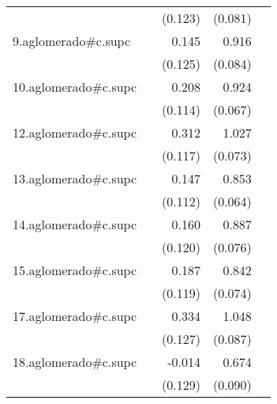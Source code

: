 {\begin{longtable}{l*{4}{D{.}{.}{-1}}}
            &                     &     (0.123)         &     (0.081)         &                     \\
\addlinespace
9.aglomerado#c.supc&                     &       0.145         &       0.916\sym{***}&                     \\
            &                     &     (0.125)         &     (0.084)         &                     \\
\addlinespace
10.aglomerado#c.supc&                     &       0.208         &       0.924\sym{***}&                     \\
            &                     &     (0.114)         &     (0.067)         &                     \\
\addlinespace
12.aglomerado#c.supc&                     &       0.312\sym{**} &       1.027\sym{***}&                     \\
            &                     &     (0.117)         &     (0.073)         &                     \\
\addlinespace
13.aglomerado#c.supc&                     &       0.147         &       0.853\sym{***}&                     \\
            &                     &     (0.112)         &     (0.064)         &                     \\
\addlinespace
14.aglomerado#c.supc&                     &       0.160         &       0.887\sym{***}&                     \\
            &                     &     (0.120)         &     (0.076)         &                     \\
\addlinespace
15.aglomerado#c.supc&                     &       0.187         &       0.842\sym{***}&                     \\
            &                     &     (0.119)         &     (0.074)         &                     \\
\addlinespace
17.aglomerado#c.supc&                     &       0.334\sym{**} &       1.048\sym{***}&                     \\
            &                     &     (0.127)         &     (0.087)         &                     \\
\addlinespace
18.aglomerado#c.supc&                     &      -0.014         &       0.674\sym{***}&                     \\
            &                     &     (0.129)         &     (0.090)         &                     \\

\end{longtable}}
